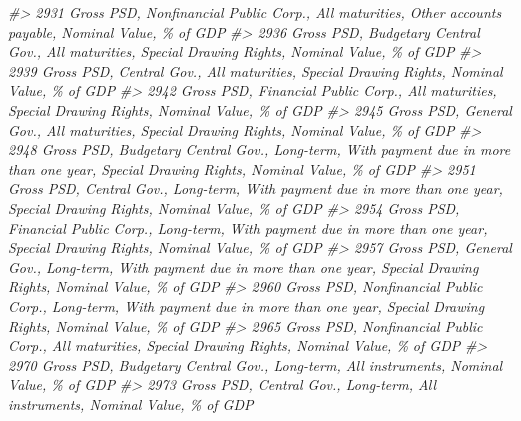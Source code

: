 \documentclass[
]{bxjsbook}
\newenvironment{Shaded}{\begin{snugshade}}{\end{snugshade}}
\newcommand{\CommentTok}[1]{\textcolor[rgb]{0.56,0.35,0.01}{\textit{#1}}}
\theoremstyle{definition}
\theoremstyle{definition}
\theoremstyle{definition}
\theoremstyle{definition}
\theoremstyle{remark}
\begin{document}
\begin{Shaded}
\begin{Highlighting}[]
\CommentTok{\#\textgreater{} 2931                                                                      Gross PSD, Nonfinancial Public Corp., All maturities, Other accounts payable, Nominal Value, \% of GDP}
\CommentTok{\#\textgreater{} 2936                                                                         Gross PSD, Budgetary Central Gov., All maturities, Special Drawing Rights, Nominal Value, \% of GDP}
\CommentTok{\#\textgreater{} 2939                                                                                   Gross PSD, Central Gov., All maturities, Special Drawing Rights, Nominal Value, \% of GDP}
\CommentTok{\#\textgreater{} 2942                                                                         Gross PSD, Financial Public Corp., All maturities, Special Drawing Rights, Nominal Value, \% of GDP}
\CommentTok{\#\textgreater{} 2945                                                                                   Gross PSD, General Gov., All maturities, Special Drawing Rights, Nominal Value, \% of GDP}
\CommentTok{\#\textgreater{} 2948                                      Gross PSD, Budgetary Central Gov., Long{-}term, With payment due in more than one year, Special Drawing Rights, Nominal Value, \% of GDP}
\CommentTok{\#\textgreater{} 2951                                                Gross PSD, Central Gov., Long{-}term, With payment due in more than one year, Special Drawing Rights, Nominal Value, \% of GDP}
\CommentTok{\#\textgreater{} 2954                                      Gross PSD, Financial Public Corp., Long{-}term, With payment due in more than one year, Special Drawing Rights, Nominal Value, \% of GDP}
\CommentTok{\#\textgreater{} 2957                                                Gross PSD, General Gov., Long{-}term, With payment due in more than one year, Special Drawing Rights, Nominal Value, \% of GDP}
\CommentTok{\#\textgreater{} 2960                                   Gross PSD, Nonfinancial Public Corp., Long{-}term, With payment due in more than one year, Special Drawing Rights, Nominal Value, \% of GDP}
\CommentTok{\#\textgreater{} 2965                                                                      Gross PSD, Nonfinancial Public Corp., All maturities, Special Drawing Rights, Nominal Value, \% of GDP}
\CommentTok{\#\textgreater{} 2970                                                                                     Gross PSD, Budgetary Central Gov., Long{-}term, All instruments, Nominal Value, \% of GDP}
\CommentTok{\#\textgreater{} 2973                                                                                               Gross PSD, Central Gov., Long{-}term, All instruments, Nominal Value, \% of GDP}

\end{Highlighting}
\end{Shaded}
\end{document}
